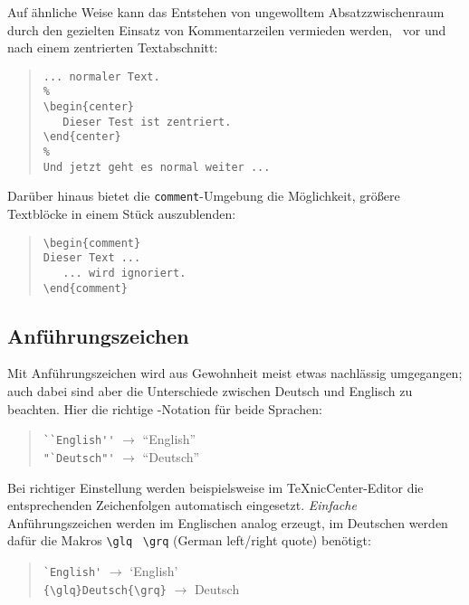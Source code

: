 \begin{sloppypar}
\noindent
Auf ähnliche Weise kann das Entstehen von ungewolltem Absatzzwischenraum durch 
den gezielten Einsatz von Kommentarzeilen vermieden werden, \zB\ vor und nach einem zentrierten
Textabschnitt:
\end{sloppypar}
%
\begin{quote}
\begin{verbatim}
... normaler Text.
%
\begin{center}
   Dieser Test ist zentriert.
\end{center}
%
Und jetzt geht es normal weiter ...
\end{verbatim}
\end{quote}
%
Darüber hinaus bietet die \verb!comment!-Umgebung die Möglichkeit, größere Text\-blöcke
in einem Stück auszublenden:
%
\begin{quote}
\begin{verbatim}
\begin{comment}
Dieser Text ...
   ... wird ignoriert.
\end{comment}
\end{verbatim}
\end{quote}




\subsection{Anführungszeichen}
\label{sec:anfuehrungszeichen}

Mit Anführungszeichen wird aus Gewohnheit meist etwas
nachlässig umgegangen; auch dabei sind aber die Unterschiede zwischen Deutsch
und Englisch zu beachten. Hier die richtige \latex-Notation für
beide Sprachen:
%
\begin{quote}
\verb!``English''! $\rightarrow$ ``English'' \\
\verb!"`Deutsch"'! $\rightarrow$ "`Deutsch"' 
\end{quote}
%
Bei richtiger Einstellung werden beispielsweise im TeXnicCenter-Editor
die entsprechenden Zeichenfolgen automatisch eingesetzt.
\emph{Einfache} Anführungszeichen werden im Englischen analog erzeugt, im Deutschen werden dafür die Makros \verb!\glq! \bzw\ \verb!\grq! (German left/right quote) benötigt:
\begin{quote}
\verb!`English'! $\rightarrow$ `English' \\
\verb!{\glq}Deutsch{\grq}! $\rightarrow$ {\glq}Deutsch{\grq} 
\end{quote}





